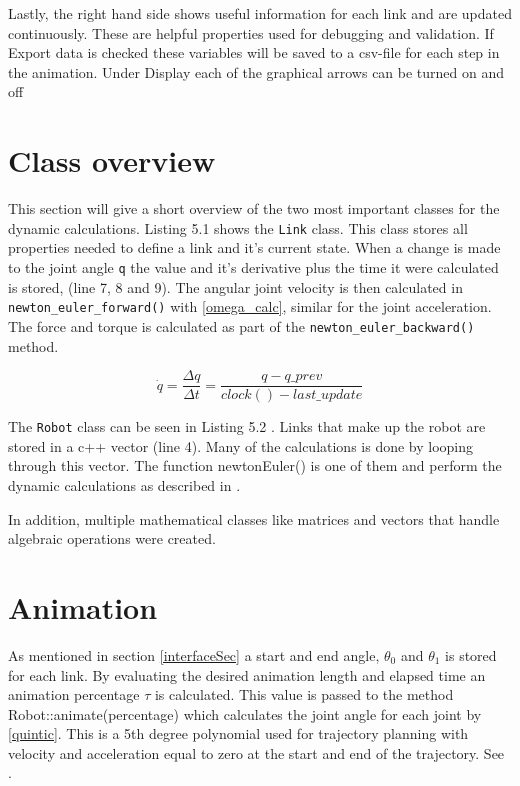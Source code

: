 Lastly, the right hand side shows useful information for each link and are updated continuously. These are helpful properties used for debugging and validation. If \textsf{Export data} is checked these variables will be saved to a csv-file for each step in the animation. Under \textsf{Display} each of the graphical arrows can be turned on and off

\section{Class overview}

This section will give a short overview of the two most important classes for the dynamic calculations. Listing 5.1  shows the \texttt{Link} class. This class stores all properties needed to define a link and it's current state. When a change is made to the joint angle \texttt{q} the value and it's derivative plus the time it were calculated is stored, (line 7, 8 and 9). The angular joint velocity is then calculated in \texttt{newton\_euler\_forward()} with \eqref{omega_calc}, similar for the joint acceleration. The force and torque is calculated as part of the \texttt{newton\_euler\_backward()} method.


\label{Link}

\begin{equation}\label{omega_calc}
\dot{q} = \frac{\Delta q}{\Delta t}=\frac{q-q\_prev}{clock()-last\_update}
\end{equation}

\label{Robot}

The \texttt{Robot} class can be seen in Listing 5.2 . Links that make up the robot are stored in a c++ vector (line 4). Many of the calculations is done by looping through this vector. The function \textsf{newtonEuler()} is one of them and perform the dynamic calculations as described in .

In addition, multiple mathematical classes like matrices and vectors that handle algebraic operations were created.

\section{Animation}

As mentioned in section \ref{interfaceSec} a start and end angle, $\theta_0$ and $\theta_1$ is stored for each link. By evaluating the desired animation length and elapsed time an animation percentage $\tau$ is calculated. This value is passed to the method \textsf{Robot::animate(percentage)} which calculates the joint angle for each joint by \eqref{quintic}. This is a 5th degree polynomial used for trajectory planning with velocity and acceleration equal to zero at the start and end of the trajectory. See .

